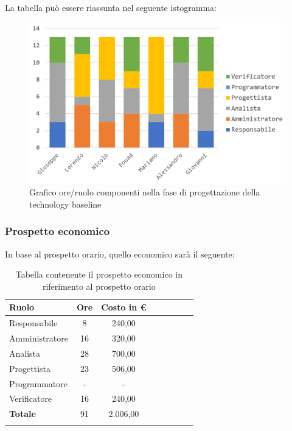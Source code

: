 		La tabella può essere riassunta nel seguente istogramma:
		\begin{figure}[H]
			\centering
			\includegraphics[width=0.8\linewidth]{./images/preventivo/progArch1.png}
			\caption{Grafico ore/ruolo componenti nella fase di progettazione della technology baseline}
			\label{fig:grafico suddivione ruoli fase progettazione della technology baseline}
		\end{figure}
	
		\subsubsection{Prospetto economico}
		In base al prospetto orario, quello economico sarà il seguente: 
		
		\begin{longtable}{|l|c|c|c|c|c|c|c|}
			\hline
			\rowcolor{lighter-grayer}
			\textbf{Ruolo} & \textbf{Ore} & \textbf{Costo in € } \\
			\hline
			\endfirsthead
			
			\hline
			Responsabile 	    & 8 & 240,00\\
			\hline 
			\hline
			Amministratore	  & 16 & 320,00\\
			\hline
			\hline
			Analista 				& 28 & 700,00\\
			\hline
			\hline
			Progettista 		  & 23 & 506,00\\
			\hline
			\hline
			Programmatore 	 & - & -\\
			\hline
			\hline
			Verificatore 		  & 16 & 240,00\\
			\hline
			\textbf{Totale} 	& 91 & 2.006,00\\
			\hline
			\caption{Tabella contenente il prospetto economico in riferimento al prospetto orario}
		\end{longtable}
		\pagebreak
		
